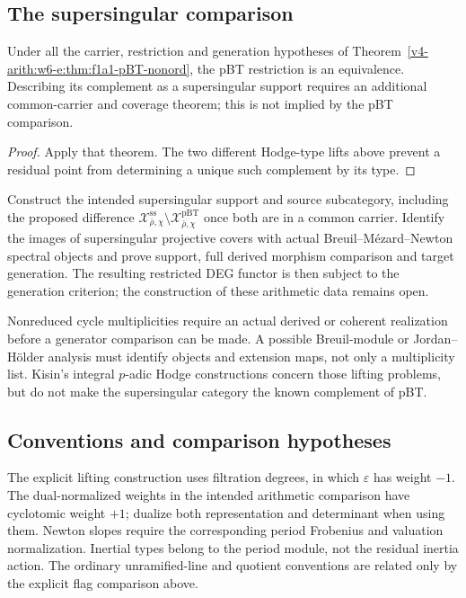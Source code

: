 \subsection{The supersingular comparison}
\begin{corollary}
\label{v4-arith:w6-e:cor:f1a1-non-ord-pBT}
Under all the carrier, restriction and generation hypotheses of
Theorem~\ref{v4-arith:w6-e:thm:f1a1-pBT-nonord}, the pBT
restriction is an equivalence. Describing its complement as a
supersingular support requires an additional common-carrier and
coverage theorem; this is not implied by the pBT comparison.
\end{corollary}
\begin{proof}
Apply that theorem. The two different Hodge-type lifts above prevent
a residual point from determining a unique such complement by its type.
\end{proof}
\begin{conjecture}
\label{v4-arith:w6-e:conj:f1a1-ss-residual}
Construct the intended supersingular support and source subcategory,
including the proposed difference
$\mathcal X^{\mathrm{ss}}_{\bar\rho,\chi}\setminus
\mathcal X^{\mathrm{pBT}}_{\bar\rho,\chi}$ once both are in a common
carrier. Identify the images of supersingular projective covers with
actual Breuil--M\'{e}zard--Newton spectral objects and prove support,
full derived morphism comparison and target generation. The resulting
restricted DEG functor is then subject to the generation criterion;
the construction of these arithmetic data remains open.
\end{conjecture}
\begin{remark}
\label{v4-arith:w6-e:rem:ss-narrower}
Nonreduced cycle multiplicities require an actual derived or coherent
realization before a generator comparison can be made. A possible
Breuil-module or Jordan--H\"older analysis must identify objects and
extension maps, not only a multiplicity list. Kisin's integral
$p$-adic Hodge constructions concern those lifting problems, but do
not make the supersingular category the known complement of pBT.
\end{remark}

\subsection{Conventions and comparison hypotheses}
The explicit lifting construction uses filtration degrees, in which
$\varepsilon$ has weight $-1$. The dual-normalized weights in the
intended arithmetic comparison have cyclotomic weight $+1$; dualize
both representation and determinant when using them. Newton slopes
require the corresponding period Frobenius and valuation normalization.
Inertial types belong to the period module, not the residual inertia
action. The ordinary unramified-line and quotient conventions are
related only by the explicit flag comparison above.

